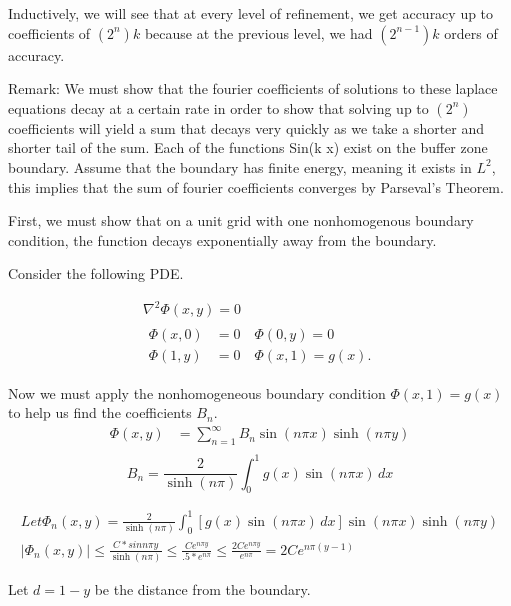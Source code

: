 \documentclass[12pt]{article}
\begin{document}
    Inductively, we will see that at every level of refinement, we get accuracy up to coefficients of $(2^n) k$ because at the previous level, we had $(2^{n-1}) k$ orders of accuracy.
    
    Remark: We must show that the fourier coefficients of solutions to these laplace equations decay at a certain rate in order to show that solving up to $(2^{n})$ coefficients will yield a sum that decays very quickly as we take a shorter and shorter tail of the sum. Each of the functions Sin(k x) exist on the buffer zone boundary. Assume that the boundary has finite energy, meaning it exists in $L^2$, this implies that the sum of fourier coefficients converges by Parseval's Theorem. 
    
    First, we must show that on a unit grid with one nonhomogenous boundary condition, the function decays exponentially away from the boundary. 
    
    Consider the following PDE. 
    
 \begin{gather}
\nabla^2 \Phi (x,y) = 0 \label{laplaceexstate}\\
\begin{split}
\Phi(x,0) &= 0 \quad \Phi(0,y) = 0 \\
\Phi(1,y) &= 0 \quad \Phi(x,1) = g(x). \label{laplaceexboundary}
\end{split}
\end{gather}    

Now we must apply the nonhomogeneous boundary condition $\Phi(x,1) = g(x)$ to help us find the coefficients $B_n$.
\begin{align*}
\Phi(x,y)  &= \sum_{n=1}^{\infty} B_n \sin(n\pi x) \sinh(n\pi y) \\
\end{align*}
\begin{equation}
B_n = \frac{2}{\sinh(n\pi)} \int_0^1 g(x) \sin(n\pi x) \, dx
\end{equation}

\begin{align*}
Let \Phi_n(x, y) =  \frac{2}{\sinh(n\pi)} \int_0^1 [g(x) \sin(n\pi x) \, dx] \sin(n\pi x) \sinh(n\pi y)\\
|\Phi_n(x, y)| \leq \frac{C*sin n \pi y}{\sinh(n\pi)} \leq \frac{C e^{n \pi y}}{.5*e^{n \pi}} \leq \frac{2C e^{n \pi y}}{e^{n \pi}} = 2C e^{n \pi (y-1)}
\end{align*}

Let $d = 1-y$ be the distance from the boundary. 
\end{document}
